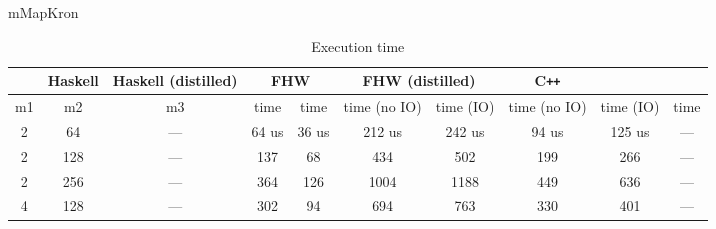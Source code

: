 \begin{table}[t]
\caption*{mMapKron}
\begin{tabular}{|c|c|c|c|c|c|c|c|c|c|} 
\hline
\rowcolor{LightBlue}
\multicolumn{3}{|c|}{Matrices dimensions} & Haskell & Haskell (distilled) & \multicolumn{2}{c|}{FHW} & \multicolumn{2}{c|}{FHW (distilled)} & {C\texttt{++}}\\
\hline
m1 & m2 & m3 & time & time & time (no IO) & time (IO) & time (no IO) & time (IO) & time \\ 
\hline
2 & 64 & --- & 64 us & 36 us & 212 us & 242 us & 94 us & 125 us & ---\\ 
2 & 128 & --- & 137 & 68 & 434 & 502 & 199 & 266 & --- \\
2 & 256 & --- & 364 & 126 & 1004 &  1188 & 449 & 636 & ---\\
4 & 128 & --- & 302 & 94 & 694 & 763 & 330 & 401 & ---\\
\hline
\end{tabular}



\caption{Execution time}
\label{tab:bench_results}

\end{table}
